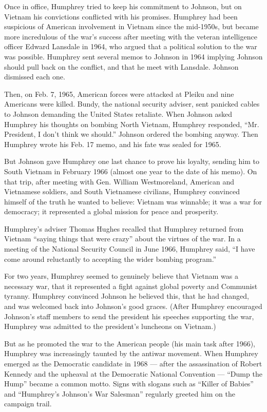Once in office, Humphrey tried to keep his commitment to Johnson, but on
Vietnam his convictions conflicted with his promises. Humphrey had been
suspicious of American involvement in Vietnam since the mid-1950s, but
became more incredulous of the war's success after meeting with the
veteran intelligence officer Edward Lansdale in 1964, who argued that a
political solution to the war was possible. Humphrey sent several memos
to Johnson in 1964 implying Johnson should pull back on the conflict,
and that he meet with Lansdale. Johnson dismissed each one.

Then, on Feb. 7, 1965, American forces were attacked at Pleiku and nine
Americans were killed. Bundy, the national security adviser, sent
panicked cables to Johnson demanding the United States retaliate. When
Johnson asked Humphrey his thoughts on bombing North Vietnam, Humphrey
responded, ``Mr. President, I don't think we should.'' Johnson ordered
the bombing anyway. Then Humphrey wrote his Feb. 17 memo, and his fate
was sealed for 1965.

But Johnson gave Humphrey one last chance to prove his loyalty, sending
him to South Vietnam in February 1966 (almost one year to the date of
his memo). On that trip, after meeting with Gen. William Westmoreland,
American and Vietnamese soldiers, and South Vietnamese civilians,
Humphrey convinced himself of the truth he wanted to believe: Vietnam
was winnable; it was a war for democracy; it represented a global
mission for peace and prosperity.

Humphrey's adviser Thomas Hughes recalled that Humphrey returned from
Vietnam ``saying things that were crazy'' about the virtues of the war.
In a meeting of the National Security Council in June 1966, Humphrey
said, ``I have come around reluctantly to accepting the wider bombing
program.''

For two years, Humphrey seemed to genuinely believe that Vietnam was a
necessary war, that it represented a fight against global poverty and
Communist tyranny. Humphrey convinced Johnson he believed this, that he
had changed, and was welcomed back into Johnson's good graces. (After
Humphrey encouraged Johnson's staff members to send the president his
speeches supporting the war, Humphrey was admitted to the president's
luncheons on Vietnam.)

But as he promoted the war to the American people (his main task after
1966), Humphrey was increasingly taunted by the antiwar movement. When
Humphrey emerged as the Democratic candidate in 1968 --- after the
assassination of Robert Kennedy and the upheaval at the Democratic
National Convention --- ``Dump the Hump'' became a common motto. Signs
with slogans such as ``Killer of Babies'' and ``Humphrey's Johnson's War
Salesman'' regularly greeted him on the campaign trail.

